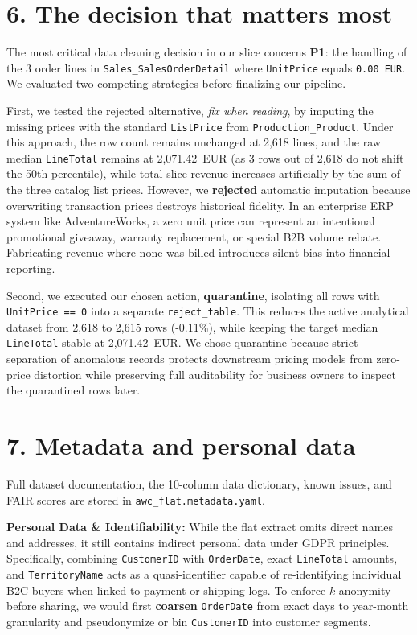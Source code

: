 \documentclass[10pt,a4paper]{article}
\newcommand{\dec}[1]{\textbf{\textcolor{hl}{#1}}}
\begin{document}
\section*{6. The decision that matters most}
The most critical data cleaning decision in our slice concerns \textbf{P1}: the handling of the 3 order lines in \texttt{Sales\_SalesOrderDetail} where \texttt{UnitPrice} equals \texttt{0.00~EUR}. We evaluated two competing strategies before finalizing our pipeline.

First, we tested the rejected alternative, \emph{fix when reading}, by imputing the missing prices with the standard \texttt{ListPrice} from \texttt{Production\_Product}. Under this approach, the row count remains unchanged at 2,618 lines, and the raw median \texttt{LineTotal} remains at 2,071.42~EUR (as 3 rows out of 2,618 do not shift the 50th percentile), while total slice revenue increases artificially by the sum of the three catalog list prices. However, we \dec{rejected} automatic imputation because overwriting transaction prices destroys historical fidelity. In an enterprise ERP system like AdventureWorks, a zero unit price can represent an intentional promotional giveaway, warranty replacement, or special B2B volume rebate. Fabricating revenue where none was billed introduces silent bias into financial reporting.

Second, we executed our chosen action, \dec{quarantine}, isolating all rows with \texttt{UnitPrice == 0} into a separate \texttt{reject\_table}. This reduces the active analytical dataset from 2,618 to 2,615 rows (-0.11\%), while keeping the target median \texttt{LineTotal} stable at 2,071.42~EUR. We chose quarantine because strict separation of anomalous records protects downstream pricing models from zero-price distortion while preserving full auditability for business owners to inspect the quarantined rows later.

\section*{7. Metadata and personal data}
Full dataset documentation, the 10-column data dictionary, known issues, and FAIR scores are stored in \texttt{awc\_flat.metadata.yaml}.

\textbf{Personal Data \& Identifiability:} While the flat extract omits direct names and addresses, it still contains indirect personal data under GDPR principles. Specifically, combining \texttt{CustomerID} with \texttt{OrderDate}, exact \texttt{LineTotal} amounts, and \texttt{TerritoryName} acts as a quasi-identifier capable of re-identifying individual B2C buyers when linked to payment or shipping logs. To enforce $k$-anonymity before sharing, we would first \dec{coarsen} \texttt{OrderDate} from exact days to year-month granularity and pseudonymize or bin \texttt{CustomerID} into customer segments.
\end{document}
